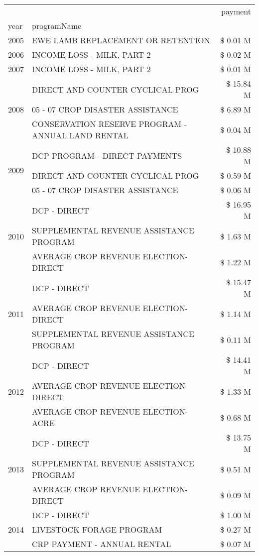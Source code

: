 \begin{tabular}{llr}
\toprule
 &  & payment \\
year & programName &  \\
\midrule
2005 & EWE LAMB REPLACEMENT OR RETENTION & \$ 0.01 M \\
\cline{1-3}
2006 & INCOME LOSS - MILK, PART 2 & \$ 0.02 M \\
\cline{1-3}
2007 & INCOME LOSS - MILK, PART 2 & \$ 0.01 M \\
\cline{1-3}
\multirow[t]{3}{*}{2008} & DIRECT AND COUNTER CYCLICAL PROG & \$ 15.84 M \\
 & 05 - 07 CROP DISASTER ASSISTANCE & \$ 6.89 M \\
 & CONSERVATION RESERVE PROGRAM - ANNUAL LAND RENTAL & \$ 0.04 M \\
\cline{1-3}
\multirow[t]{3}{*}{2009} & DCP PROGRAM - DIRECT PAYMENTS & \$ 10.88 M \\
 & DIRECT AND COUNTER CYCLICAL PROG & \$ 0.59 M \\
 & 05 - 07 CROP DISASTER ASSISTANCE & \$ 0.06 M \\
\cline{1-3}
\multirow[t]{3}{*}{2010} & DCP - DIRECT & \$ 16.95 M \\
 & SUPPLEMENTAL REVENUE ASSISTANCE PROGRAM & \$ 1.63 M \\
 & AVERAGE CROP REVENUE ELECTION-DIRECT & \$ 1.22 M \\
\cline{1-3}
\multirow[t]{3}{*}{2011} & DCP - DIRECT & \$ 15.47 M \\
 & AVERAGE CROP REVENUE ELECTION-DIRECT & \$ 1.14 M \\
 & SUPPLEMENTAL REVENUE ASSISTANCE PROGRAM & \$ 0.11 M \\
\cline{1-3}
\multirow[t]{3}{*}{2012} & DCP - DIRECT & \$ 14.41 M \\
 & AVERAGE CROP REVENUE ELECTION-DIRECT & \$ 1.33 M \\
 & AVERAGE CROP REVENUE ELECTION-ACRE & \$ 0.68 M \\
\cline{1-3}
\multirow[t]{3}{*}{2013} & DCP - DIRECT & \$ 13.75 M \\
 & SUPPLEMENTAL REVENUE ASSISTANCE PROGRAM & \$ 0.51 M \\
 & AVERAGE CROP REVENUE ELECTION-DIRECT & \$ 0.09 M \\
\cline{1-3}
\multirow[t]{3}{*}{2014} & DCP - DIRECT & \$ 1.00 M \\
 & LIVESTOCK FORAGE PROGRAM & \$ 0.27 M \\
 & CRP PAYMENT - ANNUAL RENTAL & \$ 0.07 M \\

\end{tabular}
